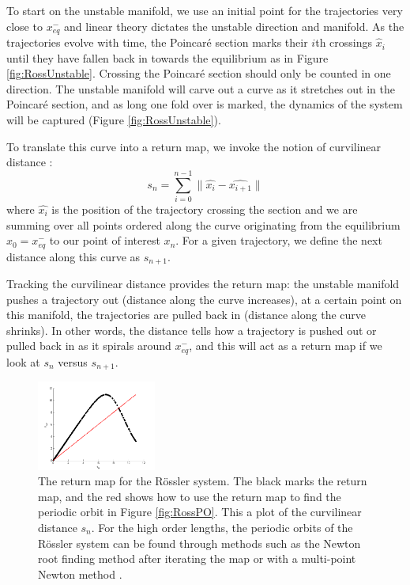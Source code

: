 \documentclass[aip,cha,reprint,
secnumarabic,
nofootinbib, tightenlines,
nobibnotes, showkeys, showpacs,
groupedaddress
]{revtex4-1}
\begin{document}
To start on the unstable manifold, we use an initial point for the trajectories very close to $x_{eq}^{-}$ and linear theory dictates the unstable direction and manifold.  As the trajectories evolve with time, the Poincar\'e section marks their $i$th crossings $\hat{x}_i$ until they have fallen back in towards the equilibrium as in Figure \ref{fig:RossUnstable}.  Crossing the Poincar\'e section should only be counted in one direction.  The unstable manifold will carve out a curve as it stretches out in the Poincar\'e section, and as long one fold over is marked, the dynamics of the system will be captured (Figure \ref{fig:RossUnstable}).

To translate this curve into a return map, we invoke the notion of curvilinear distance \cite{SRetMap}:
\begin{equation}
 s_n = \sum_{i = 0}^{n-1} \parallel \hat{x_i} - \hat{x_{i+1}} \parallel
 \label{eq:CurveDis}
\end{equation}
where $\hat{x_i}$ is the position of the trajectory crossing the section and we are summing over all points ordered along the curve originating from the equilibrium $x_0 = x_{eq}^{-}$ to our point of interest $x_n$.  For a given trajectory, we define the next distance along this curve as $s_{n+1}$.

Tracking the curvilinear distance provides the return map: the unstable manifold pushes a trajectory out (distance along the curve increases), at a certain point on this manifold, the trajectories are pulled back in (distance along the curve shrinks).  In other words, the distance tells how a trajectory is pushed out or pulled back in as it spirals around $x_{eq}^{-}$, and this will act as a return map if we look at $s_n$ versus $s_{n+1}$.
\begin{figure}[h]
\centering
  \includegraphics[width=0.35\textwidth]{Figs/Section1/kcrosslerretmap.png}
\caption{
 The return map for the R\"ossler system.  The black marks the return map, and the red shows how to use the return map to find the periodic orbit in Figure \ref{fig:RossPO}.  This a plot of the curvilinear distance $s_n$.  For the high order lengths, the periodic orbits of the R\"ossler system can be found through methods such as the Newton root finding method after iterating the map or with a multi-point Newton method \cite{CB}.
}
 \label{fig:RossRetmap}
\end{figure}
\end{document}
